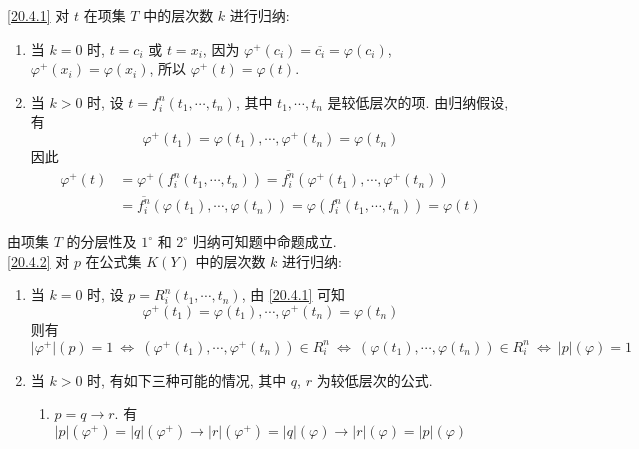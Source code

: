 \documentclass[boxes]{homework}
\begin{document}
\begin{solution}
    \ref{20.4.1} 对 $t$ 在项集 $T$ 中的层次数 $k$ 进行归纳:
    \begin{enumerate}[label = $\arabic*^\circ$, itemsep = 0em, topsep = .5em, partopsep = .5em]
        \item 当 $k = 0$ 时, $t = c_i$ 或 $t = x_i$, 因为 $\varphi^+(c_i) = \overline{c_i} = \varphi(c_i)$, $\varphi^+(x_i)=\varphi(x_i)$, 所以 $\varphi^+(t) = \varphi(t)$.
        \item 当 $k > 0$ 时, 设 $t = f_i^n(t_1, \cdots, t_n)$, 其中 $t_1, \cdots, t_n$ 是较低层次的项. 由归纳假设, 有
              $$
                  \varphi^+(t_1) = \varphi(t_1), \cdots, \varphi^+(t_n) = \varphi(t_n)
              $$
              因此
              \begin{align*}
                  \varphi^+(t) & = \varphi^+(f_i^n(t_1, \cdots, t_n)) = \overline{f_i^n}(\varphi^+(t_1), \cdots, \varphi^+(t_n))        \\
                               & = \overline{f_i^n}(\varphi(t_1), \cdots, \varphi(t_n)) = \varphi(f_i^n(t_1, \cdots, t_n)) = \varphi(t)
              \end{align*}
    \end{enumerate}
    由项集 $T$ 的分层性及 $1^\circ$ 和 $2^\circ$ 归纳可知题中命题成立.
    \\
    \ref{20.4.2} 对 $p$ 在公式集 $K(Y)$ 中的层次数 $k$ 进行归纳:
    \begin{enumerate}[label = $\arabic*^\circ$, itemsep = 0em, topsep = .5em, partopsep = .5em]
        \item 当 $k = 0$ 时, 设 $p = R_i^n(t_1, \cdots, t_n)$, 由 \ref{20.4.1} 可知
              $$
                  \varphi^+(t_1) = \varphi(t_1), \cdots, \varphi^+(t_n) = \varphi(t_n)
              $$
              则有
              $$
                  \lvert\varphi^+\rvert(p) = 1\ \Leftrightarrow\ (\varphi^+(t_1), \cdots, \varphi^+(t_n))\in R_i^n\ \Leftrightarrow\ (\varphi(t_1), \cdots, \varphi(t_n))\in R_i^n\ \Leftrightarrow\ \lvert p\rvert(\varphi) = 1
              $$
        \item 当 $k > 0$ 时, 有如下三种可能的情况, 其中 $q$, $r$ 为较低层次的公式.
              \begin{enumerate}[label = (\arabic*), itemsep = 0em, topsep = .5em, partopsep = .5em]
                  \item $p = q\to r$. 有 $\lvert p\rvert(\varphi^+) = \lvert q\rvert(\varphi^+)\to \lvert r\rvert(\varphi^+) =\lvert q\rvert(\varphi)\to \lvert r\rvert(\varphi) = \lvert p\rvert(\varphi)$

\end{enumerate}
\end{enumerate}
\end{solution}
\end{document}
